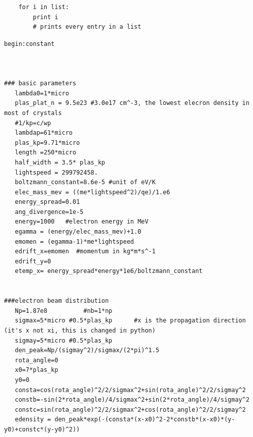 \documentclass[%
onecolumn, notitlepage,
 amsmath,amssymb,
 aps,
]{article}
\begin{document}
\clearpage


\begin{lstlisting}
    for i in list:
        print i
        # prints every entry in a list
\end{lstlisting}


\begin{lstlisting}
begin:constant



### basic parameters
   lambda0=1*micro
   plas_plat_n = 9.5e23 #3.0e17 cm^-3, the lowest elecron density in most of crystals
   #1/kp=c/wp
   lambdap=61*micro
   plas_kp=9.71*micro 
   length =250*micro
   half_width = 3.5* plas_kp
   lightspeed = 299792458.
   boltzmann_constant=8.6e-5 #unit of eV/K
   elec_mass_mev = ((me*lightspeed^2)/qe)/1.e6
   energy_spread=0.01
   ang_divergence=1e-5
   energy=1000   #electron energy in MeV
   egamma = (energy/elec_mass_mev)+1.0
   emomen = (egamma-1)*me*lightspeed
   edrift_x=emomen  #momentum in kg*m*s^-1
   edrift_y=0
   etemp_x= energy_spread*energy*1e6/boltzmann_constant


###electron beam distribution
   Np=1.87e8          #nb=1*np
   sigmax=5*micro #0.5*plas_kp      #x is the propagation direction (it's x not xi, this is changed in python)
   sigmay=5*micro #0.5*plas_kp
   den_peak=Np/(sigmay^2)/sigmax/(2*pi)^1.5
   rota_angle=0
   x0=7*plas_kp
   y0=0
   consta=cos(rota_angle)^2/2/sigmax^2+sin(rota_angle)^2/2/sigmay^2
   constb=-sin(2*rota_angle)/4/sigmax^2+sin(2*rota_angle)/4/sigmay^2
   constc=sin(rota_angle)^2/2/sigmax^2+cos(rota_angle)^2/2/sigmay^2
   edensity = den_peak*exp(-(consta*(x-x0)^2-2*constb*(x-x0)*(y-y0)+constc*(y-y0)^2))

\end{lstlisting}







\clearpage
 \vfill
 
 


 
\end{document}
